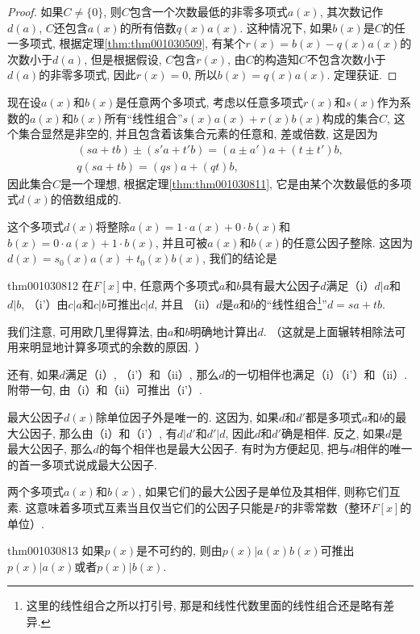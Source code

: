 \begin{proof}
如果$C \neq \{0\}$, 则$C$包含一个次数最低的非零多项式$a(x)$, 其次数记作$d(a)$, $C$还包含$a(x)$的所有倍数$q(x)a(x)$. 这种情况下, 如果$b(x)$是$C$的任一多项式, 根据定理\ref{thm:thm001030509}, 有某个$r(x)=b(x)-q(x)a(x)$的次数小于$d(a)$, 但是根据假设, $C$包含$r(x)$, 由$C$的构造知$C$不包含次数小于$d(a)$的非零多项式, 因此$r(x)=0$, 所以$b(x)=q(x)a(x)$. 定理获证. 
\end{proof}

现在设$a(x)$和$b(x)$是任意两个多项式, 考虑以任意多项式$r(x)$和$s(x)$作为系数的$a(x)$和$b(x)$所有“线性组合”$s(x)a(x)+r(x)b(x)$构成的集合$C$, 这个集合显然是非空的, 并且包含着该集合元素的任意和, 差或倍数, 这是因为
\begin{gather*}
(sa+tb) \pm (s'a+t'b) = (a \pm a')a+(t \pm t')b,\\
q(sa+tb) = (qs)a + (qt)b,
\end{gather*}
因此集合$C$是一个理想, 根据定理\ref{thm:thm001030811}, 它是由某个次数最低的多项式$d(x)$的倍数组成的. 

这个多项式$d(x)$将整除$a(x) = 1 \cdot a(x) + 0 \cdot b(x)$和$b(x) = 0 \cdot a(x) + 1\cdot b(x)$, 并且可被$a(x)$和$b(x)$的任意公因子整除. 这因为$d(x)=s_0(x)a(x)+t_0(x)b(x)$, 我们的结论是
\begin{theorem}{}{thm001030812}
在$F[x]$中, 任意两个多项式$a$和$b$具有最大公因子$d$满足（i）$d|a$和$d|b$, （i'）由$c|a$和$c|b$可推出$c|d$, 并且 （ii）$d$是$a$和$b$的“线性组合\footnote{这里的线性组合之所以打引号, 那是和线性代数里面的线性组合还是略有差异. }”$d=sa+tb$. 
\end{theorem}

我们注意, 可用欧几里得算法, 由$a$和$b$明确地计算出$d$. （这就是上面辗转相除法可用来明显地计算多项式的余数的原因. ）

还有, 如果$d$满足（i）, （i'）和（ii）, 那么$d$的一切相伴也满足（i）（i'）和（ii）. 附带一句, 由（i）和（ii）可推出（i'）. 

最大公因子$d(x)$除单位因子外是唯一的. 这因为, 如果$d$和$d'$都是多项式$a$和$b$的最大公因子, 那么由（i）和（i'）, 有$d|d'$和$d'|d$, 因此$d$和$d'$确是相伴. 反之, 如果$d$是最大公因子, 那么$d$的每个相伴也是最大公因子. 有时为方便起见, 把与$d$相伴的唯一的首一多项式说成最大公因子. 

两个多项式$a(x)$和$b(x)$, 如果它们的最大公因子是单位及其相伴, 则称它们互素. 这意味着多项式互素当且仅当它们的公因子只能是$F$的非零常数（整环$F[x]$的单位）. 

\begin{theorem}{}{thm001030813}
如果$p(x)$是不可约的, 则由$p(x)|a(x)b(x)$可推出$p(x)|a(x)$或者$p(x)|b(x)$. 
\end{theorem}

